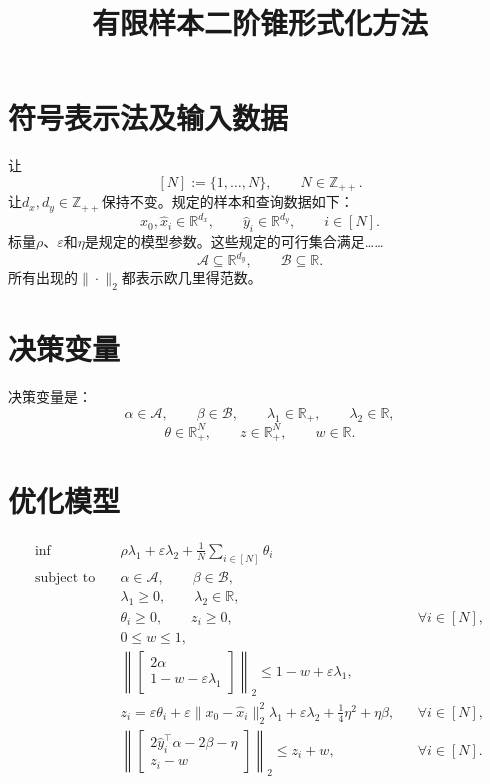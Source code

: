 \documentclass[11pt]{article}
\title{有限样本二阶锥形式化方法}
\author{}
\date{}
\begin{document}
\maketitle

\section*{符号表示法及输入数据}
让
\[
[N] := \{1,\ldots,N\},
\qquad N\in\mathbb{Z}_{++}.
\]
让$d_x,d_y\in\mathbb{Z}_{++}$保持不变。规定的样本和查询数据如下：
\[
x_0,\widehat{x}_i\in\mathbb{R}^{d_x},
\qquad
\widehat{y}_i\in\mathbb{R}^{d_y},
\qquad i\in[N].
\]
标量$\rho$、$\varepsilon$和$\eta$是规定的模型参数。这些规定的可行集合满足……
\[
\mathcal{A}\subseteq\mathbb{R}^{d_y},
\qquad
\mathcal{B}\subseteq\mathbb{R}.
\]
所有出现的$\|\cdot\|_2$都表示欧几里得范数。

\section*{决策变量}
决策变量是：
\[
\alpha\in\mathcal{A},
\qquad
\beta\in\mathcal{B},
\qquad
\lambda_1\in\mathbb{R}_+,
\qquad
\lambda_2\in\mathbb{R},
\]
\[
\theta\in\mathbb{R}_+^N,
\qquad
z\in\mathbb{R}_+^N,
\qquad
w\in\mathbb{R}.
\]

\section*{优化模型}
\begin{align}
\inf\quad
& \rho\lambda_1+\varepsilon\lambda_2
  +\frac{1}{N}\sum_{i\in[N]}\theta_i
\label{eq:objective}\\[0.25em]
\text{subject to}\quad
& \alpha\in\mathcal{A},
  \qquad \beta\in\mathcal{B},
\label{eq:sets}\\
& \lambda_1\ge 0,
  \qquad \lambda_2\in\mathbb{R},
\label{eq:lambda-domains}\\
& \theta_i\ge 0,
  \qquad z_i\ge 0,
  && \forall i\in[N],
\label{eq:vector-domains}\\
& 0\le w\le 1,
\label{eq:w-domain}\\
& \left\|
  \begin{bmatrix}
  2\alpha\\
  1-w-\varepsilon\lambda_1
  \end{bmatrix}
  \right\|_2
  \le 1-w+\varepsilon\lambda_1,
\label{eq:first-soc}\\
& z_i
  =\varepsilon\theta_i
  +\varepsilon\|x_0-\widehat{x}_i\|_2^2\lambda_1
  +\varepsilon\lambda_2
  +\frac{1}{4}\eta^2
  +\eta\beta,
  && \forall i\in[N],
\label{eq:z-definition}\\
& \left\|
  \begin{bmatrix}
  2\widehat{y}_i^{\top}\alpha-2\beta-\eta\\
  z_i-w
  \end{bmatrix}
  \right\|_2
  \le z_i+w,
  && \forall i\in[N].
\label{eq:second-soc}
\end{align}
\end{document}
